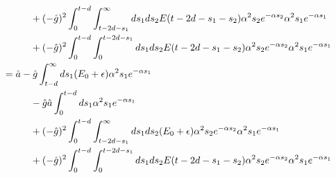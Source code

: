 \begin{align}
	& \hspace{1 cm} + (-\hat{g})^2 \int_{0}^{t-d} \int_{t - 2d - s_1}^{\infty} ds_1 ds_2 E(t - 2d - s_1 - s_2) \alpha^2 s_2 e^{-\alpha s_2} \alpha^2 s_1 e^{-\alpha s_1} \\
	& \hspace{1 cm} + (-\hat{g})^2 \int_{0}^{t - d} \int_{0}^{t - 2d - s_1} ds_1 ds_2 E(t - 2d - s_1 - s_2) \alpha^2 s_2 e^{-\alpha s_2} \alpha^2 s_1 e^{-\alpha s_1} \\
	&= \hat{a} - \hat{g} \int_{t - d}^{\infty} ds_1 ( E_0 + \epsilon ) \alpha^2 s_1 e^{-\alpha s_1}\\
	& \hspace{1 cm} - \hat{g} \hat{a} \int_{0}^{t - d} ds_1 \alpha^2 s_1 e^{-\alpha s_1}\\
	& \hspace{1 cm} +(-\hat{g})^2 \int_{0}^{t-d} \int_{t - 2d - s_1}^{\infty} ds_1 ds_2 (E_0 + \epsilon) \alpha^2 s_2 e^{-\alpha s_2} \alpha^2 s_1 e^{-\alpha s_1} \\
	& \hspace{1 cm} +(-\hat{g})^2 \int_{0}^{t - d} \int_{0}^{t - 2d - s_1} ds_1 ds_2 E(t - 2d - s_1 - s_2) \alpha^2 s_2 e^{-\alpha s_2} \alpha^2 s_1 e^{-\alpha s_1}
\end{align}

